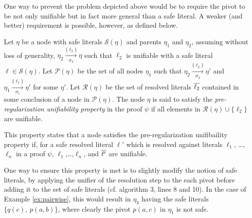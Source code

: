 \noindent
One way to prevent the problem depicted above would be to require the pivot to be not only unifiable but in fact more general than a safe literal. A weaker (and better) requirement is possible, however, as defined below.


\begin{definition}
\label{prop:pair}
Let $\eta$ be a node with safe literals $\mathcal{S}(\eta)$ and parents $\eta_1$ and $\eta_2$, assuming without loss of generality, $\eta_2 \xrightarrow[\sigma_2]{\{\ell_2\} } \eta$ such that $\ell_2$ is unifiable with a safe literal $\ell \in \mathcal{S}(\eta)$. Let $\mathcal{P}(\eta)$ be the set 
of all nodes $\eta_1$ such that $\eta_2 \xrightarrow[\sigma_2]{\{\ell_2\} } \eta'$ and $\eta_1 \xrightarrow[\sigma_1]{\{\ell_1\} } \eta'$ for some $\eta'$.
Let $\mathcal{R}(\eta)$ be the set of resolved literals $\overline{\ell_2}$ contained in some conclusion of a node in $\mathcal{P}(\eta)$.
The node $\eta$ is said to satisfy the \emph{pre-regularization unifiability property} in the proof $\psi$ if all elements in $\mathcal{R}(\eta)\cup\{\ell_2\}$ are unifiable.
\end{definition}

\noindent
This property states that a node satisfies the pre-regularization unifibaility property if, for a safe resolved literal $\ell'$ which is resolved against literals $\ell_1$, \ldots, $\ell_n$ in a proof $\psi$, $\ell_1$,\ldots,$\ell_n$, and $\overline{\ell'}$ are unifiable.

One way to ensure this property is met is to slightly modify the notion of safe literals, by applying the unifier of the resolution step to the each pivot before adding it to the set of safe literals (cf. algorithm 3, lines 8 and 10). In the case of Example \ref{ex:pairwise}, this would result in $\eta_3$ having the safe literals $\{q(c),~p(a,b)\}$, where clearly the pivot $p(a,c)$ in $\eta_1$ is not safe.


